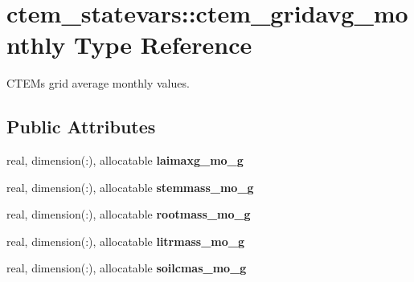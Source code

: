 \hypertarget{structctem__statevars_1_1ctem__gridavg__monthly}{}\section{ctem\+\_\+statevars\+:\+:ctem\+\_\+gridavg\+\_\+monthly Type Reference}
\label{structctem__statevars_1_1ctem__gridavg__monthly}


C\+T\+E\+M\textquotesingle{}s grid average monthly values.  


\subsection*{Public Attributes}
\begin{DoxyCompactItemize}
\item 
\hypertarget{structctem__statevars_1_1ctem__gridavg__monthly_ade05da72b3a8325e8caa31ddf305aaeb}{}real, dimension(\+:), allocatable {\bfseries laimaxg\+\_\+mo\+\_\+g}\label{structctem__statevars_1_1ctem__gridavg__monthly_ade05da72b3a8325e8caa31ddf305aaeb}

\item 
\hypertarget{structctem__statevars_1_1ctem__gridavg__monthly_ac4ecf610da4fb220ea898ead6809f350}{}real, dimension(\+:), allocatable {\bfseries stemmass\+\_\+mo\+\_\+g}\label{structctem__statevars_1_1ctem__gridavg__monthly_ac4ecf610da4fb220ea898ead6809f350}

\item 
\hypertarget{structctem__statevars_1_1ctem__gridavg__monthly_a5130d81f33f8d84d0409ad15ed89eae5}{}real, dimension(\+:), allocatable {\bfseries rootmass\+\_\+mo\+\_\+g}\label{structctem__statevars_1_1ctem__gridavg__monthly_a5130d81f33f8d84d0409ad15ed89eae5}

\item 
\hypertarget{structctem__statevars_1_1ctem__gridavg__monthly_ab85f12959a9b39b1090581e6a4b45fe5}{}real, dimension(\+:), allocatable {\bfseries litrmass\+\_\+mo\+\_\+g}\label{structctem__statevars_1_1ctem__gridavg__monthly_ab85f12959a9b39b1090581e6a4b45fe5}

\item 
\hypertarget{structctem__statevars_1_1ctem__gridavg__monthly_ae3dd3c52d0575f33c417afed9f87626b}{}real, dimension(\+:), allocatable {\bfseries soilcmas\+\_\+mo\+\_\+g}\label{structctem__statevars_1_1ctem__gridavg__monthly_ae3dd3c52d0575f33c417afed9f87626b}


\end{DoxyCompactItemize}
